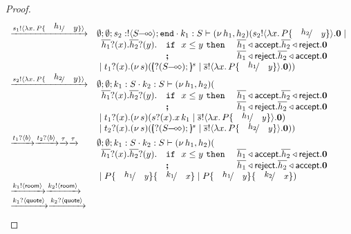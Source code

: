 \begin{proof}
\[\begin{array}{ll}
		\by{\bactout{s_1}{\abs{x}{P \subst{h_1}{y}}}}&
		\es; \es; s_2: \btout{\lhot{S}} \tinact \cat k_1: S \proves \newsp{h_1, h_2}{\bout{s_2}{\abs{x}{P \subst{h_2}{y}}} \inact \Par\\
		&
		\begin{array}{lll}
			\binp{\dual{h_1}}{x} \binp{\dual{h_2}}{y} & \If\ x \leq y\ \Then & \bsel{\dual{h_1}}{\accept} \bsel{\dual{h_2}}{\reject} \inact\\
			& \Else& \bsel{\dual{h_1}}{\reject} \bsel{\dual{h_2}}{\accept} \inact
		\end{array} \\
		& \Par \binp{t_1}{x} \newsp{s}{\mapchar{\btinp{\lhot{S}}}{s} \Par \bout{\dual{s}}{\abs{x}{P \subst{h_1}{y}}} \inact }}
\\
		\by{\bactout{s_2}{\abs{x}{P \subst{h_2}{y}}}}&
		\es; \es; k_1: S \cat k_2: S \proves \newsp{h_1, h_2}{\\
		&
		\begin{array}{lll}
			\binp{\dual{h_1}}{x} \binp{\dual{h_2}}{y} & \If\ x \leq y\ \Then & \bsel{\dual{h_1}}{\accept} \bsel{\dual{h_2}}{\reject} \inact\\
			& \Else& \bsel{\dual{h_1}}{\reject} \bsel{\dual{h_2}}{\accept} \inact
		\end{array} \\
		& \Par \binp{t_1}{x} \newsp{s}{\binp{s}{x} \appl{x}{k_1} \Par \bout{\dual{s}}{\abs{x}{P \subst{h_1}{y}}} \inact }\\
		& \Par \binp{t_2}{x} \newsp{s}{\mapchar{\btinp{\lhot{S}}}{s} \Par \bout{\dual{s}}{\abs{x}{P \subst{h_2}{y}}} \inact }}
\\

		\by{\bactinp{t_1}{b}} \by{\bactinp{t_2}{b}} \by{\tau}\by{\tau}&
		\es; \es; k_1: S \cat k_2: S \proves \newsp{h_1, h_2}{\\
		&
		\begin{array}{lll}
			\binp{\dual{h_1}}{x} \binp{\dual{h_2}}{y} & \If\ x \leq y\ \Then & \bsel{\dual{h_1}}{\accept} \bsel{\dual{h_2}}{\reject} \inact\\
			& \Else& \bsel{\dual{h_1}}{\reject} \bsel{\dual{h_2}}{\accept} \inact
		\end{array} \\
		& \Par P\subst{h_1}{y} \subst{k_1}{x} \Par P\subst{h_1}{y} \subst{k_2}{x}}
\\

		\by{\bactout{k_1}{\rtype}} \by{\bactout{k_2}{\rtype}}
		\\
		\by{\bactinp{k_1}{\Quote}} \by{\bactinp{k_2}{\Quote}}
\\


\end{array}\]
\end{proof}
